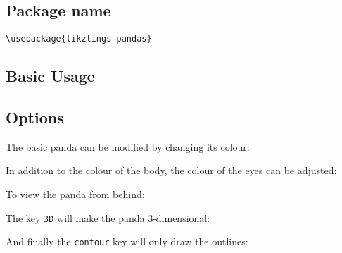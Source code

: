 \documentclass[parskip=half]{scrartcl}
\begin{document}
\subsection{Package name}

\begin{tcolorbox}[lower separated=false, lefthand width=.8\linewidth]
\vspace*{0.5cm}
\lstinline|\usepackage{tikzlings-pandas}| 
\vspace*{0.5cm}
\end{tcolorbox}

\subsection{Basic Usage}

\begin{tcblisting}{}
\panda
\end{tcblisting}

\subsection{Options}

The basic panda can be modified by changing its colour:
\begin{tcblisting}{}
\panda[body=blue]
\end{tcblisting}

In addition to the colour of the body, the colour of the eyes can be adjusted:
\begin{tcblisting}{}
\panda[eye=red]
\end{tcblisting}
\begin{tcblisting}{}
\panda[pupil=red]
\end{tcblisting}

To view the panda from behind:
\begin{tcblisting}{}
\panda[back]
\end{tcblisting}

The key \lstinline|3D| will make the panda 3-dimensional:
\begin{tcblisting}{}
\panda[3D]
\end{tcblisting}

And finally the \lstinline|contour| key will only draw the outlines:
\begin{tcblisting}{}
\panda[contour=black]
\end{tcblisting}

%
%
\clearpage
\end{document}
